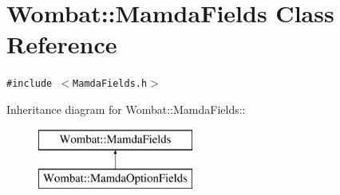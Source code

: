 \hypertarget{classWombat_1_1MamdaFields}{
\section{Wombat::Mamda\-Fields Class Reference}
\label{classWombat_1_1MamdaFields}
}
{\tt \#include $<$Mamda\-Fields.h$>$}

Inheritance diagram for Wombat::Mamda\-Fields::\begin{figure}[H]
\begin{center}
\leavevmode
\includegraphics[height=2cm]{classWombat_1_1MamdaFields}
\end{center}
\end{figure}
